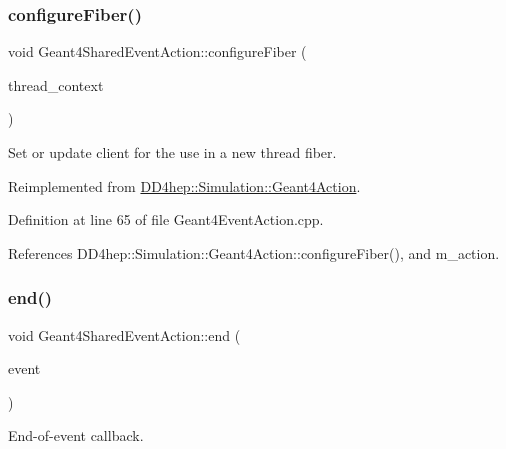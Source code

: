 \subsubsection{\texorpdfstring{configure\+Fiber()}{configureFiber()}}
{\footnotesize\ttfamily void Geant4\+Shared\+Event\+Action\+::configure\+Fiber (\begin{DoxyParamCaption}\item[{\hyperlink{class_d_d4hep_1_1_simulation_1_1_geant4_context}{Geant4\+Context} $\ast$}]{thread\+\_\+context }\end{DoxyParamCaption})\hspace{0.3cm}{\ttfamily [virtual]}}



Set or update client for the use in a new thread fiber. 



Reimplemented from \hyperlink{class_d_d4hep_1_1_simulation_1_1_geant4_action_a6adc7138508303e4e417cb48a737ab19}{D\+D4hep\+::\+Simulation\+::\+Geant4\+Action}.



Definition at line 65 of file Geant4\+Event\+Action.\+cpp.



References D\+D4hep\+::\+Simulation\+::\+Geant4\+Action\+::configure\+Fiber(), and m\+\_\+action.

\hypertarget{class_d_d4hep_1_1_simulation_1_1_geant4_shared_event_action_a207f1882eece3c87364b38b266bd9935}{}\label{class_d_d4hep_1_1_simulation_1_1_geant4_shared_event_action_a207f1882eece3c87364b38b266bd9935} 
\subsubsection{\texorpdfstring{end()}{end()}}
{\footnotesize\ttfamily void Geant4\+Shared\+Event\+Action\+::end (\begin{DoxyParamCaption}\item[{const G4\+Event $\ast$}]{event }\end{DoxyParamCaption})\hspace{0.3cm}{\ttfamily [virtual]}}



End-\/of-\/event callback. 



